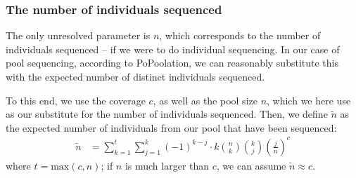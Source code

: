 \documentclass[a4paper,fontsize=9pt,DIV=14]{scrartcl}
\newcounter{todo}
\newcounter{popoolissue}
\newcommand\todo[1]{}
\newcommand\popoolissue[1]{}
\newcommand{\coverage}{c}
\begin{document}
\popoolissue{Furthermore, we tested the computation of alpha*, and it also gives NaN values for input 2 and 3, so the test should in fact be $>= 4$ instead.}


\subsubsection*{The number of individuals sequenced}

The only unresolved parameter is $n$, which corresponds to the number of individuals sequenced --
if we were to do individual sequencing.
In our case of pool sequencing, according to PoPoolation,
we can reasonably substitute this with the expected number of distinct individuals sequenced.

To this end, we use the coverage $\coverage$, as well as the pool size $n$, which we here use as our substitute for the number of individuals sequenced.
Then, we define $\tilde{n}$ as the expected number of individuals from our pool that have been sequenced:
%
\begin{align}
    \label{eq:IndivSeqBruteForce}
    \tilde{n}
    &= \sum_{k=1}^{t} \sum_{j=1}^{k} (-1)^{k-j} \cdot k \binom{n}{k} \binom{k}{j} \left(\frac{j}{n}\right)^\coverage
\end{align}
%
where $t=\text{max}(\coverage, n)$; if $n$ is much larger than $\coverage$, we can assume $\tilde{n} \approx \coverage$.

\popoolissue{We think that there is either an error here, or a bug in the code. The code in PoPoolation actually uses the minimum of coverage and pool size in the above, instead of the maximum as stated above, see \href{https://github.com/lczech/popoolation/blob/092e7a6f7ee4910c1bec4377e0adccc353175bc8/Modules/VarMath.pm\#L156}{here}. We are not sure which one is correct though, or what the implications of this are.}
\end{document}
